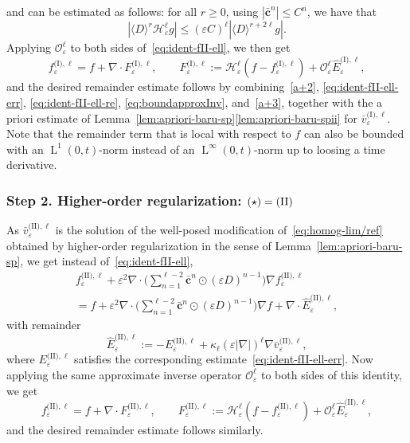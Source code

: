 \documentclass[10pt]{amsart}
\theoremstyle{plain}
\theoremstyle{definition}
\numberwithin{equation}{section}
\newcommand{\e}{\varepsilon}
\newcommand{\cc}{{\boldsymbol c}}
\newcommand{\Ld}{\operatorname{L}}
\newcommand{\step}[1]{\subsubsection*{Step \textup #1}}
\begin{document}
{{and can be estimated as follows{:} for all $r\ge0$, using $|\bar\cc^n|\le C^n$, {we have that}
\begin{equation}\label{a+3}
|\langle D\rangle^r\mathcal H_\e^\ell g| \le (\e C)^\ell | \langle D\rangle^{r+2\ell} g|. 
\end{equation}
Applying} $\mathcal O_\e^\ell$ to both sides of~\eqref{eq:ident-fII-ell}, we then get
\begin{equation*}
f_\e^{\text{(I)},\ell}=f+\nabla\cdot F_\e^{\text{(I)},\ell},
\qquad F_\e^{\text{(I)},\ell}:= \mathcal H_\e^\ell (f-f_\e^{\text{(I)},\ell})+\mathcal O_\e^\ell\hat E_\e^{\text{(I)},\ell},
\end{equation*}
and the desired remainder estimate follows by combining~\eqref{a+2}, \eqref{eq:ident-fII-ell-err}, \eqref{eq:ident-fII-ell-re}, \eqref{eq:boundapproxInv}, and~\eqref{a+3}, together with the a priori estimate of Lemma~\ref{lem:apriori-baru-sp}\eqref{lem:apriori-baru-spii} for $\bar v_\e^{\text{(I)},\ell}$. Note that the remainder term that is local with respect to $f$ can also be bounded with an $\Ld^1(0,t)$-norm instead of an $\Ld^\infty(0,t)$-norm up to loosing a time derivative.}

\step{2. High{er}-order regularization: $(\star)=\textup{(II)}$}
As $\bar v_\e^{\text{(II)},\ell}$ is the solution of the well-posed modification of~\eqref{eq:homog-lim/ref} obtained by higher-order regularization in the sense of Lemma~\ref{lem:apriori-baru-sp}, we get instead of~\eqref{eq:ident-fII-ell},\vspace*{-5pt}
\begin{multline*}
f_\e^{\text{(II)},\ell}+\e^2\nabla\cdot\Big(\sum_{n=1}^{\ell-2}\bar\cc^n\odot(\e D)^{n-1}\Big)\nabla f_\e^{\text{(II)},\ell}\\[-10pt]
=f+\e^2\nabla\cdot\Big(\sum_{n=1}^{\ell-2}\bar\cc^n\odot(\e D)^{n-1}\Big)\nabla f+\nabla\cdot\hat E_\e^{\text{(II)},\ell},
\end{multline*}
with remainder\vspace*{-3pt}
\begin{equation*}
\hat E_\e^{\text{(II)},\ell}:=-E_\e^{\text{(II)},\ell}+\kappa_\ell(\e|\nabla|)^{\ell}\nabla\bar v_\e^{\text{(II)},\ell},
\end{equation*}
where $E_\e^{\text{(II)},\ell}$ satisfies the corresponding estimate~\eqref{eq:ident-fII-ell-err}.
Now applying the same approximate inverse operator $\mathcal O_\e^\ell$ to both sides of this identity, we get\vspace*{-1pt}
\begin{equation*}
f_\e^{\text{(II)},\ell}=f+\nabla\cdot F_\e^{\text{(II)},\ell},
\qquad F_\e^{\text{(II)},\ell}:= \mathcal H_\e^\ell (f-f_\e^{\text{(II)},\ell})+\mathcal O_\e^\ell\hat E_\e^{\text{(II)},\ell},
\end{equation*}
and the desired remainder estimate follows similarly.
\end{document}
